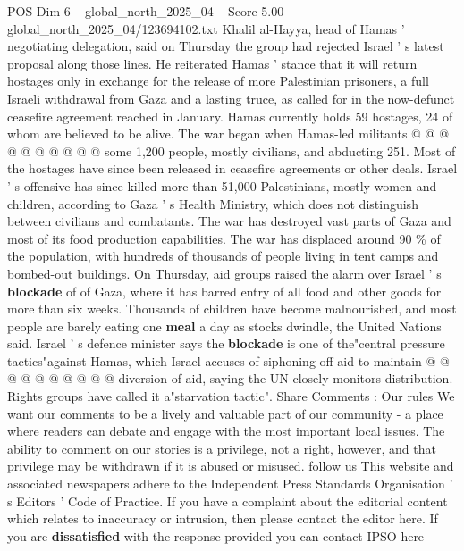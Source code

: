 \begin{textsample}{POS Dim 6 – global\_north\_2025\_04 – Score 5.00 – global\_north\_2025\_04/123694102.txt}
Khalil al-Hayya, head of Hamas ' negotiating delegation, said on Thursday the group had rejected Israel ' s latest proposal along those lines.
He reiterated Hamas ' stance that it will return hostages only in exchange for the release of more Palestinian prisoners, a full Israeli withdrawal from Gaza and a lasting truce, as called for in the now-defunct ceasefire agreement reached in January.
Hamas currently holds 59 hostages, 24 of whom are believed to be alive.
The war began when Hamas-led militants @ @ @ @ @ @ @ @ @ @ some 1,200 people, mostly civilians, and abducting 251.
Most of the hostages have since been released in ceasefire agreements or other deals.
Israel ' s offensive has since killed more than 51,000 Palestinians, mostly women and children, according to Gaza ' s Health Ministry, which does not distinguish between civilians and combatants.
The war has destroyed vast parts of Gaza and most of its food production capabilities.
The war has displaced around 90 \% of the population, with hundreds of thousands of people living in tent camps and bombed-out buildings.
On Thursday, aid groups raised the alarm over Israel ' s \textbf{blockade} of of Gaza, where it has barred entry of all food and other goods for more than six weeks.
Thousands of children have become malnourished, and most people are barely eating one \textbf{meal} a day as stocks dwindle, the United Nations said.
Israel ' s defence minister says the \textbf{blockade} is one of the"central pressure tactics"against Hamas, which Israel accuses of siphoning off aid to maintain @ @ @ @ @ @ @ @ @ @ diversion of aid, saying the UN closely monitors distribution.
Rights groups have called it a"starvation tactic".
Share Comments : Our rules We want our comments to be a lively and valuable part of our community - a place where readers can debate and engage with the most important local issues.
The ability to comment on our stories is a privilege, not a right, however, and that privilege may be withdrawn if it is abused or misused. follow us This website and associated newspapers adhere to the Independent Press Standards Organisation ' s Editors ' Code of Practice.
If you have a complaint about the editorial content which relates to inaccuracy or intrusion, then please contact the editor here.
If you are \textbf{dissatisfied} with the response provided you can contact IPSO here

\end{textsample}
